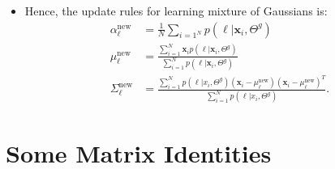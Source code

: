 \documentclass[10pt]{article}
\newcommand{\x}{\mathbf{x}}
\newcommand{\new}{\mathrm{new}}
\begin{document}
\begin{itemize}
    \item Hence, the update rules for learning mixture of Gaussians is:
    \begin{align*}      
      \alpha^{\new}_\ell &= \frac{1}{N} \sum_{i=1^N} p(\ell|\x_i, \Theta^g)\\
      \mu^{\new}_\ell &= \frac{\sum_{i=1}^N \x_i p(\ell|\x_i,\Theta^g)}{\sum_{i=1}^N p(\ell|\x_i,\Theta^g)}\\
      \Sigma^{\new}_\ell &= \frac{\sum_{i=1}^N p(\ell|x_i,\Theta^g) (\x_i - \mu_\ell^\new)(\x_i - \mu_\ell^\new)^T}{\sum_{i=1}^N p(\ell|x_i,\Theta^g)}.
    \end{align*}
    
  \end{itemize}
  
  \section{Some Matrix Identities}
\end{document}
